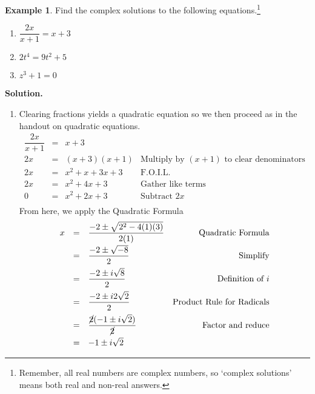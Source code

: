 \documentclass[11pt]{article}
\theoremstyle{definition}  %
\newtheorem{ex}{\bf Example}
\begin{document}
\begin{ex} \label{complexsolnsreviewex}  Find the complex solutions to the following equations.\footnote{Remember, all real numbers are complex numbers, so `complex solutions' means both real and non-real answers.} 

\begin{multicols}{3}
\begin{enumerate}


\item  $\dfrac{2x}{x+1} = x+3$

\item $2t^4 = 9t^2 + 5$

\item  $z^3 + 1 = 0$

\end{enumerate}
\end{multicols}

{\bf Solution.}

\begin{enumerate}

\enlargethispage{20pt}

\item  Clearing fractions yields a quadratic equation so we then proceed as in the handout on quadratic equations.\[ \begin{array}{rclr}


\dfrac{2x}{x+1} & = &  x+3 & \\[5pt]
2x & = & (x+3)(x+1) & \text{Multiply by $(x+1)$ to clear denominators} \\

2x & = & x^2 + x + 3x + 3 & \text{F.O.I.L.} \\

2x & = & x^2 + 4x + 3 & \text{Gather like terms} \\

0 & = & x^2 + 2x + 3 & \text{Subtract $2x$} \\

\end{array}\] From here, we apply the Quadratic Formula \[ \begin{array}{rclr}

x  & =  & \dfrac{-2 \pm \sqrt{2^2 - 4(1)(3)}}{2(1)}  & \text{Quadratic Formula}\\[8pt]
    & = &  \dfrac{-2 \pm \sqrt{-8}}{2} & \text{Simplify}\\[8pt]
		& =  & \dfrac{-2 \pm i \sqrt{8}}{2} & \text{Definition of $i$}\\[8pt]
		& =  & \dfrac{-2 \pm i 2\sqrt{2}}{2} & \text{Product Rule for Radicals}\\[8pt]
		& = & \dfrac{\cancel{2}(-1 \pm i\sqrt{2})}{\cancel{2}} & \text{Factor and reduce}\\[8pt]
		& = & -1 \pm i \sqrt{2} & \\
		\end{array} \]
		

\end{enumerate}
\end{ex}
\end{document}
